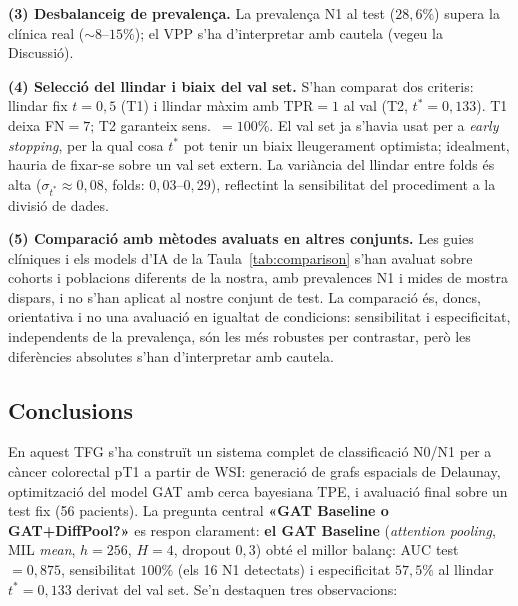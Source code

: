 \documentclass[10pt,a4paper,twocolumn,twoside]{article}
\begin{document}
\textbf{(3) Desbalanceig de prevalença.}
La prevalença N1 al test ($28{,}6\%$) supera la clínica real ($\sim\!8$–$15\%$); el VPP
s'ha d'interpretar amb cautela (vegeu la Discussió).

\textbf{(4) Selecció del llindar i biaix del val set.}
S'han comparat dos criteris: llindar fix $t\!=\!0{,}5$ (T1) i llindar màxim amb TPR$=1$ al val
(T2, $t^*\!=\!0{,}133$). T1 deixa FN$=7$; T2 garanteix sens.\ $=\!100\%$. El val set ja
s'havia usat per a \textit{early stopping}, per la qual cosa $t^*$ pot tenir un biaix
lleugerament optimista; idealment, hauria de fixar-se sobre un val set extern. La variància del
llindar entre folds és alta ($\sigma_{t^*}\!\approx\!0{,}08$, folds: $0{,}03$--$0{,}29$),
reflectint la sensibilitat del procediment a la divisió de dades.

\textbf{(5) Comparació amb mètodes avaluats en altres conjunts.}
Les guies clíniques i els models d'IA de la Taula~\ref{tab:comparison} s'han avaluat sobre
cohorts i poblacions diferents de la nostra, amb prevalences N1 i mides de mostra dispars, i
no s'han aplicat al nostre conjunt de test. La comparació és, doncs, orientativa i no
una avaluació en igualtat de condicions: sensibilitat i especificitat, independents de la
prevalença, són les més robustes per contrastar, però les diferències absolutes s'han
d'interpretar amb cautela.

\subsection{Conclusions}

En aquest TFG s'ha construït un sistema complet de classificació N0/N1 per a càncer
colorectal pT1 a partir de WSI: generació de grafs espacials de Delaunay, optimització
del model GAT amb cerca bayesiana TPE, i avaluació final sobre un test fix (56 pacients).
La pregunta central \textbf{«GAT Baseline o GAT+DiffPool?»} es respon clarament:
\textbf{el GAT Baseline} (\textit{attention pooling}, MIL \textit{mean}, $h\!=\!256$,
$H\!=\!4$, dropout $0{,}3$) obté el millor balanç: AUC test $=0{,}875$, sensibilitat
$100\%$ (els 16 N1 detectats) i especificitat $57{,}5\%$ al llindar $t^*\!=\!0{,}133$
derivat del val set. Se'n destaquen tres observacions:
\end{document}
